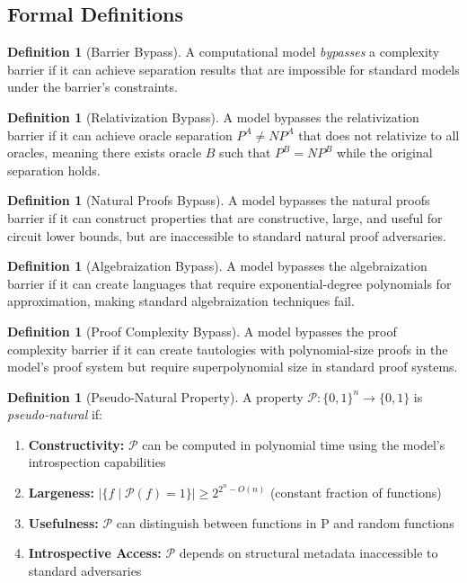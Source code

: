\documentclass[11pt]{article}
\theoremstyle{plain}
\theoremstyle{definition}
\newtheorem{definition}[theorem]{Definition}
\begin{document}
\subsection{Formal Definitions}

\begin{definition}[Barrier Bypass]
A computational model \textit{bypasses} a complexity barrier if it can achieve separation results that are impossible for standard models under the barrier's constraints.
\end{definition}

\begin{definition}[Relativization Bypass]
A model bypasses the relativization barrier if it can achieve oracle separation $P^A \neq NP^A$ that does not relativize to all oracles, meaning there exists oracle $B$ such that $P^B = NP^B$ while the original separation holds.
\end{definition}

\begin{definition}[Natural Proofs Bypass]
A model bypasses the natural proofs barrier if it can construct properties that are constructive, large, and useful for circuit lower bounds, but are inaccessible to standard natural proof adversaries.
\end{definition}

\begin{definition}[Algebraization Bypass]
A model bypasses the algebraization barrier if it can create languages that require exponential-degree polynomials for approximation, making standard algebraization techniques fail.
\end{definition}

\begin{definition}[Proof Complexity Bypass]
A model bypasses the proof complexity barrier if it can create tautologies with polynomial-size proofs in the model's proof system but require superpolynomial size in standard proof systems.
\end{definition}

\begin{definition}[Pseudo-Natural Property]
A property $\mathcal{P}: \{0,1\}^n \to \{0,1\}$ is \textit{pseudo-natural} if:
\begin{enumerate}
\item \textbf{Constructivity:} $\mathcal{P}$ can be computed in polynomial time using the model's introspection capabilities
\item \textbf{Largeness:} $|\{f \mid \mathcal{P}(f) = 1\}| \geq 2^{2^n - O(n)}$ (constant fraction of functions)
\item \textbf{Usefulness:} $\mathcal{P}$ can distinguish between functions in $\text{P}$ and random functions
\item \textbf{Introspective Access:} $\mathcal{P}$ depends on structural metadata inaccessible to standard adversaries
\end{enumerate}
\end{definition}
\end{document}
